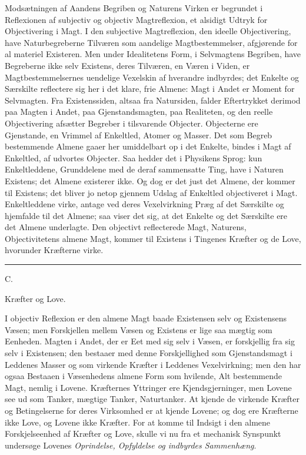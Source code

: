 \documentclass[12pt,a4paper]{book}
\newcommand{\afdeling}[2]{%
  \par\vspace{1.3\baselineskip}%
  {\centering #1\par\vspace{0.2\baselineskip}\normalsize #2\par}%
  \addcontentsline{toc}{section}{#1 #2}%
  \vspace{0.8\baselineskip}\par\nointerlineskip}
\newcommand{\streg}{\begin{center}\rule{2cm}{0.4pt}\end{center}}
\begin{document}
Modsætningen af Aandens Begriben og Naturens Virken er begrundet i
Reflexionen af subjectiv og objectiv Magtreflexion, et alsidigt Udtryk
for Objectivering i Magt. I den subjective Magtreflexion, den ideelle
Objectivering, have Naturbegreberne Tilværen som aandelige
Magtbestemmelser, afgjørende for al materiel Existeren. Men under
Idealitetens Form, i Selvmagtens Begriben, have Begreberne ikke selv
Existens, deres Tilværen, en Væren i Viden, er Magtbestemmelsernes
uendelige Vexelskin af hverandre indbyrdes; det Enkelte og Særskilte
reflectere sig her i det klare, frie Almene: Magt i Andet er Moment for
Selvmagten. Fra Existenssiden, altsaa fra Natursiden, falder
Eftertrykket derimod paa Magten i Andet, paa Gjenstandsmagten, paa
Realiteten, og den reelle Objectivering afsætter Begreber i tilsvarende
Objecter. Objecterne ere Gjenstande, en Vrimmel af Enkeltled, Atomer og
Masser. Det som Begreb bestemmende Almene gaaer her umiddelbart op i
det Enkelte, bindes i Magt af Enkeltled, af udvortes Objecter. Saa
hedder det i Physikens Sprog: kun Enkeltleddene, Grunddelene med de
deraf sammensatte Ting, have i Naturen Existens; det Almene existerer
ikke. Og dog er det just det Almene, der kommer til Existens; det
bliver jo netop gjennem Udslag af Enkeltled objectiveret i Magt.
Enkeltleddene virke, antage ved deres Vexelvirkning Præg af det
Særskilte og hjemfalde til det Almene; saa viser det sig, at det Enkelte
og det Særskilte ere det Almene underlagte. Den objectivt reflecterede
Magt, Naturens, Objectivitetens almene Magt, kommer til Existens i
Tingenes Kræfter og de Love, hvorunder Kræfterne virke.

\streg


\afdeling{C.}{Kræfter og Love.}

I objectiv Reflexion er den almene Magt baade Existensen selv og
Existensens Væsen; men Forskjellen mellem Væsen og Existens er lige saa
mægtig som Eenheden. Magten i Andet, der er Eet med sig selv i Væsen,
er forskjellig fra sig selv i Existensen; den bestaaer med denne
Forskjellighed som Gjenstandsmagt i Leddenes Masser og som virkende
Kræfter i Leddenes Vexelvirkning; men den har ogsaa Bestaaen i
Væsenhedens almene Form som hvilende, Alt bestemmende Magt, nemlig i
Lovene. Kræfternes Yttringer ere Kjendsgjerninger, men Lovene see ud som
Tanker, mægtige Tanker, Naturtanker. At kjende de virkende Kræfter og
Betingelserne for deres Virksomhed er at kjende Lovene; og dog ere
Kræfterne ikke Love, og Lovene ikke Kræfter. For at komme til Indsigt i
den almene Forskjelseenhed af Kræfter og Love, skulle vi nu fra et
mechanisk Synspunkt undersøge Lovenes
\emph{Oprindelse, Opfyldelse og indbyrdes Sammenhæng}.
\end{document}
